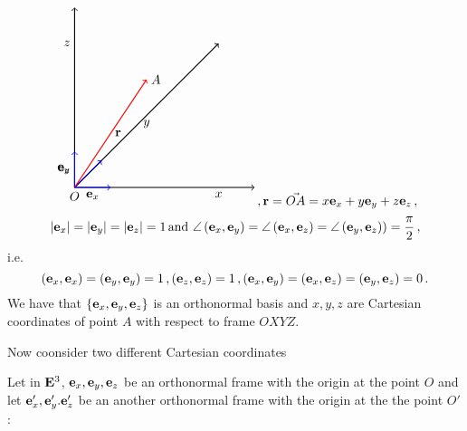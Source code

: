 \documentclass[12pt]{article}
\numberwithin{equation}{section}
\begin{document}
     \begin{equation*}
\begin{tikzpicture}
\draw 
[ <-> , thick] 
(5,0)--(0,0)--(0,5);
\draw 
[ -> , thick] 
(0,0)--(4,4);


\draw [thick, ->,blue] (0,0)--(1,0);
\node [below] at (0.5,0) {$\e_x$};

\draw [thick, ->,blue] (0,0)--(0,1);
\node [left] at (0,0.5) {$\e_z$};

\draw [thick, ->,blue] (0,0)--(0.75,0.75);
\node [left] at (0,0.5) {$\e_y$};

\node [left] at (0,4) {$z$};
\node [below] at (4,0) {$x$};
\node [below] at (2,2) {$y$};
\node [below] at (0,0) {$O$};

\draw [thick, red,->] (0,0)--(2,3); 
\node [right] at (1,1.5) {$\r$};
\node [right] at (2,3) {$A$};
\end{tikzpicture}\,,
\r=\vec {OA}=x\e_x+y\e_y+z\e_z\,,
\end{equation*}
\begin{equation*}
|{\bf e}_x|=|{\bf e}_y|=|{\bf e}_z|=1\, {\rm and }\,\,
\angle \left({\bf e}_x,{\bf e}_y\right)=
\angle \left({\bf e}_x,{\bf e}_z\right)=
\angle \left({\bf e}_y,{\bf e}_z\right))={\pi\over 2}\,,
    \end{equation*} 
i.e.
   \begin{equation*}
({\bf e}_x,{\bf e}_x)=({\bf e}_y,{\bf e}_y)=1\,, ({\bf e}_z,{\bf e}_z)=1\,,
({\bf e}_x,{\bf e}_y)=({\bf e}_x,{\bf e}_z)=({\bf e}_y,{\bf e}_z)=0\,.
\end{equation*}
  We have that $\{{\bf e}_x,{\bf e}_y,{\bf e}_z\}$ is an orthonormal basis
and $x,y,z$ are Cartesian coordinates of point
$A$ with respect to frame  $OXYZ$.


\m




  Now coonsider two different Cartesian coordinates
 


Let in ${\bf E}^3$, ${{\bf e}_x,{\bf e}_y,{\bf e}_z}$ be an orthonormal 
frame with  the origin at the point $O$
and let ${{\bf e}'_x,{\bf e}'_y.{\bf e}'_z}$ be an another
orthonormal 
frame with the origin at the the point $O'$:
\end{document}
